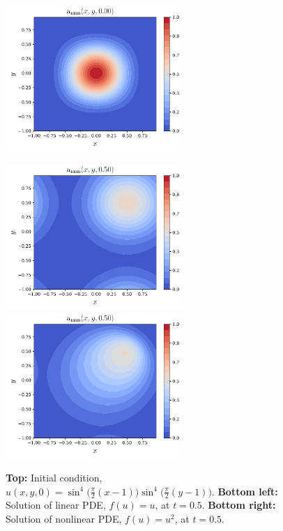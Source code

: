 \documentclass[review]{siamart}
\begin{document}
\begin{figure}[htb!]
\centerline{
\includegraphics[width = 0.6\textwidth]{../figures/ic}
}
\centerline{
\includegraphics[width = 0.6\textwidth]{../figures/linear}
\quad
\includegraphics[width = 0.6\textwidth]{../figures/nonlinear}
}
\caption{\textbf{Top:} Initial condition, $u(x,y,0)= \sin^4 \big(\tfrac{\pi}{2}(x-1) \big) \sin^4 \big(\tfrac{\pi}{2}(y-1) \big)$. \textbf{Bottom left:} Solution of linear PDE, $f(u)=u$, at $t=0.5$. \textbf{Bottom right:} Solution of nonlinear PDE, $f(u)=u^2$, at $t=0.5$.
\label{fig:example}
}
\end{figure}
\end{document}

